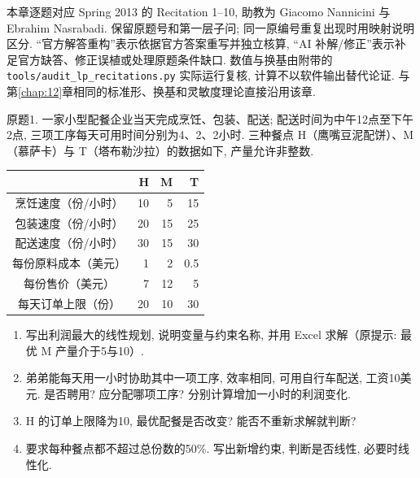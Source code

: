 \label{ass:15053-recitations}
本章逐题对应 Spring 2013 的 Recitation 1--10, 助教为 Giacomo Nannicini 与 Ebrahim Nasrabadi. 保留原题号和第一层子问; 同一原编号重复出现时用映射说明区分. “官方解答重构”表示依据官方答案重写并独立核算, “AI 补解/修正”表示补足官方缺答、修正误植或处理原题条件缺口. 数值与换基由附带的 \nolinkurl{tools/audit_lp_recitations.py} 实际运行复核, 计算不以软件输出替代论证. 与第\ref{chap:12}章相同的标准形、换基和灵敏度理论直接沿用该章.

\begin{exercise}\label{ass:15053-rec1-q1}
原题1. 一家小型配餐企业当天完成烹饪、包装、配送; 配送时间为中午12点至下午2点, 三项工序每天可用时间分别为4、2、2小时. 三种餐点 H（鹰嘴豆泥配饼）、M（慕萨卡）与 T（塔布勒沙拉）的数据如下, 产量允许非整数.
\begin{center}\begin{tabular}{c|rrr}
 &H&M&T\\\hline
烹饪速度（份/小时）&10&5&15\\
包装速度（份/小时）&20&15&25\\
配送速度（份/小时）&30&15&30\\
每份原料成本（美元）&1&2&0.5\\
每份售价（美元）&7&12&5\\
每天订单上限（份）&20&10&30
\end{tabular}\end{center}
\begin{enumerate}[label=(\Alph*)]
\item 写出利润最大的线性规划, 说明变量与约束名称, 并用 Excel 求解（原提示: 最优 M 产量介于5与10）.
\item 弟弟能每天用一小时协助其中一项工序, 效率相同, 可用自行车配送, 工资10美元. 是否聘用? 应分配哪项工序? 分别计算增加一小时的利润变化.
\item H 的订单上限降为10, 最优配餐是否改变? 能否不重新求解就判断?
\item 要求每种餐点都不超过总份数的50\%. 写出新增约束, 判断是否线性, 必要时线性化.
\end{enumerate}
\end{exercise}
